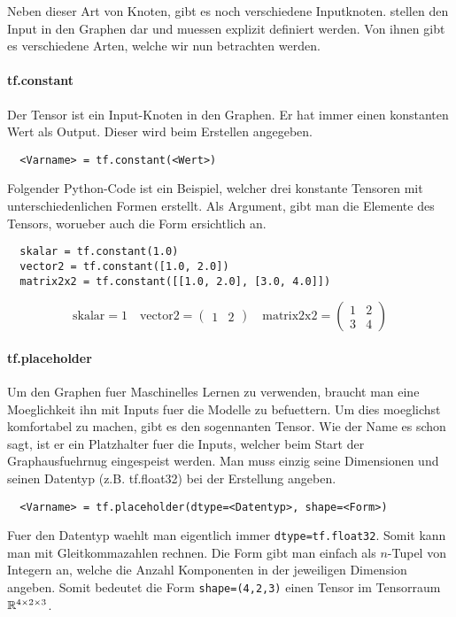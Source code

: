 Neben dieser Art von Knoten, gibt es noch verschiedene Inputknoten.
stellen den Input in den Graphen dar und muessen explizit definiert werden. Von ihnen gibt es verschiedene Arten,
welche wir nun betrachten werden.

\paragraph{tf.constant}
Der  Tensor ist ein Input-Knoten in den Graphen.
Er hat immer einen konstanten Wert als Output. Dieser wird beim Erstellen
angegeben.
\begin{verbatim}
  <Varname> = tf.constant(<Wert>)
\end{verbatim}
\para{}
Folgender Python-Code ist ein Beispiel, welcher drei konstante Tensoren mit unterschiedenlichen
Formen erstellt. Als Argument, gibt man die Elemente des Tensors, worueber auch
die Form ersichtlich an.
\begin{verbatim}
  skalar = tf.constant(1.0)
  vector2 = tf.constant([1.0, 2.0])
  matrix2x2 = tf.constant([[1.0, 2.0], [3.0, 4.0]])
\end{verbatim}
\[\text{skalar}=1 \quad \text{vector2}=\begin{pmatrix}1&2\end{pmatrix} \quad
\text{matrix2x2}=\begin{pmatrix}1&2\\3&4\end{pmatrix}\]

\paragraph{tf.placeholder}
Um den Graphen fuer Maschinelles Lernen zu verwenden, braucht man eine
Moeglichkeit ihn mit Inputs fuer die Modelle zu befuettern. Um dies moeglichst
komfortabel zu machen, gibt es den sogennanten
 Tensor. Wie der Name es schon sagt, ist er ein
Platzhalter fuer die Inputs, welcher beim Start der Graphausfuehrnug eingespeist
werden. Man muss einzig seine Dimensionen und seinen Datentyp (z.B. tf.float32) bei der Erstellung angeben.
\para{}
\begin{verbatim}
  <Varname> = tf.placeholder(dtype=<Datentyp>, shape=<Form>)
\end{verbatim}
Fuer den Datentyp waehlt man eigentlich immer
\texttt{dtype=tf.float32}. Somit kann man mit Gleitkommazahlen rechnen.
Die Form gibt man einfach als $n$-Tupel von Integern an, welche die Anzahl
Komponenten in der jeweiligen Dimension angeben. Somit bedeutet die Form
\texttt{shape=(4,2,3)} einen Tensor im Tensorraum $\mathbb{R}^{4 \times
2 \times 3}$.

